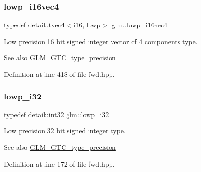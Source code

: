 \subsubsection{\texorpdfstring{lowp\+\_\+i16vec4}{lowp\_i16vec4}}
{\footnotesize\ttfamily typedef \hyperlink{structglm_1_1detail_1_1tvec4}{detail\+::tvec4}$<$\hyperlink{group__gtc__type__precision_ga35e5542ca05b29cc256fdafb8503d1fd}{i16}, \hyperlink{namespaceglm_a0f04f086094c747d227af4425893f545ae161af3fc695e696ce3bf69f7332bc2d}{lowp}$>$ \hyperlink{group__gtc__type__precision_ga59ea63973187e1e990fb6633d1800c6d}{glm\+::lowp\+\_\+i16vec4}}

Low precision 16 bit signed integer vector of 4 components type. \begin{DoxySeeAlso}{See also}
\hyperlink{group__gtc__type__precision}{G\+L\+M\+\_\+\+G\+T\+C\+\_\+type\+\_\+precision} 
\end{DoxySeeAlso}


Definition at line 418 of file fwd.\+hpp.

\mbox{\label{group__gtc__type__precision_ga70fd34e8b8cffc92739161284ed77328}} 
\subsubsection{\texorpdfstring{lowp\+\_\+i32}{lowp\_i32}}
{\footnotesize\ttfamily typedef \hyperlink{namespaceglm_1_1detail_a9f85b4efeca416cdcec2fd08939a2e17}{detail\+::int32} \hyperlink{group__gtc__type__precision_ga70fd34e8b8cffc92739161284ed77328}{glm\+::lowp\+\_\+i32}}

Low precision 32 bit signed integer type. \begin{DoxySeeAlso}{See also}
\hyperlink{group__gtc__type__precision}{G\+L\+M\+\_\+\+G\+T\+C\+\_\+type\+\_\+precision} 
\end{DoxySeeAlso}


Definition at line 172 of file fwd.\+hpp.

\mbox{\label{group__gtc__type__precision_gadb82f1c8a0f4d3304862d32079961974}} 

